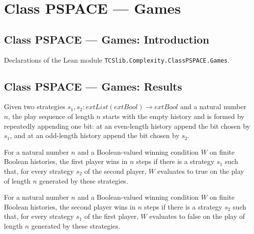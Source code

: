 \section{Class PSPACE --- Games}
\subsection*{Class PSPACE --- Games: Introduction}

Declarations of the Lean module \texttt{TCSlib.Complexity.ClassPSPACE.Games}.

\subsection*{Class PSPACE --- Games: Results}

\begin{definition}
\label{Complexity.Game.playOut}
\leanok
Given two strategies $s_1,s_2 : 	ext{List}(	ext{Bool})\to	ext{Bool}$ and a natural
number $n$, the play sequence of length $n$ starts with the empty history and is formed
by repeatedly appending one bit: at an even-length history append the bit chosen by
$s_1$, and at an odd-length history append the bit chosen by $s_2$.
\end{definition}

\begin{definition}
\label{Complexity.Game.FirstWins}
\leanok
{}
For a natural number $n$ and a Boolean-valued winning condition $W$ on finite Boolean
histories, the first player wins in $n$ steps if there is a strategy $s_1$ such that,
for every strategy $s_2$ of the second player, $W$ evaluates to true on the play of
length $n$ generated by these strategies.
\end{definition}

\begin{definition}
\label{Complexity.Game.SecondWins}
\leanok
{}
For a natural number $n$ and a Boolean-valued winning condition $W$ on finite Boolean
histories, the second player wins in $n$ steps if there is a strategy $s_2$ such that,
for every strategy $s_1$ of the first player, $W$ evaluates to false on the play of
length $n$ generated by these strategies.
\end{definition}

